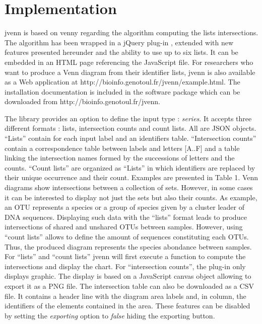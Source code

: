 \documentclass{bmcart}
\begin{document}
\section*{Implementation}

jvenn is based on venny regarding the algorithm computing the lists intersections.
The algorithm has been wrapped in a jQuery plug-in \cite{jquery}, extended with 
new features presented hereunder and the ability to use up to six lists. 
It can be embedded in an HTML page referencing the JavaScript file. For researchers
who want to produce a Venn diagram from their identifier lists, jvenn is also
available as a Web application at http://bioinfo.genotoul.fr/jvenn/example.html.
The installation documentation is included in the software package which can be
downloaded from http://bioinfo.genotoul.fr/jvenn.

The library provides an option to define the input type : \textit{series}. It
accepts three different formats : lists, intersection counts and count lists. 
All are JSON objects. ``Lists'' contain for each input label and an
identifiers table. ``Intersection counts'' contain a correspondence table 
between labels and letters [A..F] and a table linking the intersection names formed 
by the successions of letters and the counts. ``Count lists'' are organized as ``Lists'' 
in which identifiers are replaced by their unique occurrence and their count.
Examples are presented in Table 1. Venn diagrams show intersections between a
collection of sets. However, in some cases it can be interested to display not
just the sets but also their counts. As example, an OTU represents a species or
a group of species given by a cluster leader of DNA sequences. Displaying such
data with the ``lists'' format leads to produce intersections of shared and
unshared OTUs between samples. However, using ``count lists'' allows to define
the amount of sequences constituting each OTUs. Thus, the produced diagram
represents the species abondance between samples. For ``lists'' and ``count
lists'' jvenn will first execute a function to compute the intersections and 
display the chart. For ``intersection counts'', the plug-in  only displays
graphic. The display is based on a JavaScript canvas object  allowing to export 
it as a PNG file. The intersection table can also be downloaded as a CSV file.
It contains a header line with the diagram area labels and, in column, the
identifiers of the elements contained in the area. These features  can be 
disabled by setting the \textit{exporting} option to \textit{false} hiding the
exporting button.
\end{document}
